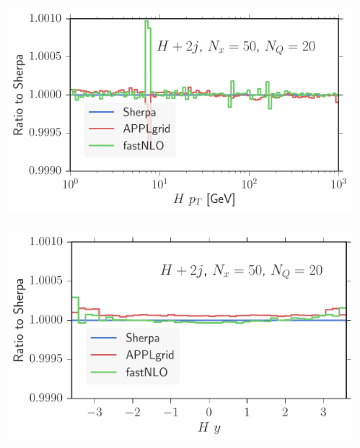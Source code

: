 \begin{figure}
\centering
\begin{subfigure}[]{0.49\textwidth}
	\includegraphics[width=\textwidth]{images/hjjb_hpt.pdf}
\end{subfigure}
\hfill
\begin{subfigure}[]{0.49\textwidth}
	\includegraphics[width=\textwidth]{images/hjjb_hy.pdf}
\end{subfigure}


\end{figure}
